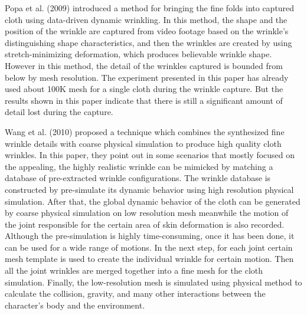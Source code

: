 Popa et al. (2009) introduced a method for bringing the fine folds into captured cloth using data-driven dynamic wrinkling. In this method, the shape and the position of the wrinkle are captured from video footage based on the wrinkle’s distinguishing shape characteristics, and then the wrinkles are created by using stretch-minimizing deformation, which produces believable wrinkle shape. However in this method, the detail of the wrinkles captured is bounded from below by mesh resolution. The experiment presented in this paper has already used about 100K mesh for a single cloth during the wrinkle capture. But the results shown in this paper indicate that there is still a significant amount of detail lost during the capture. 

Wang et al. (2010) proposed a technique which combines the synthesized fine wrinkle details with coarse physical simulation to produce high quality cloth wrinkles. In this paper, they point out in some scenarios that mostly focused on the appealing, the highly realistic wrinkle can be mimicked by matching a database of pre-extracted wrinkle configurations. The wrinkle database is constructed by pre-simulate its dynamic behavior using high resolution physical simulation. After that, the global dynamic behavior of the cloth can be generated by coarse physical simulation on low resolution mesh meanwhile the motion of the joint responsible for the certain area of skin deformation is also recorded. Although the pre-simulation is highly time-consuming, once it has been done, it can be used for a wide range of motions. In the next step, for each joint certain mesh template is used to create the individual wrinkle for certain motion. Then all the joint wrinkles are merged together into a fine mesh for the cloth simulation. Finally, the low-resolution mesh is simulated using physical method to calculate the collision, gravity, and many other interactions between the character’s body and the environment.



